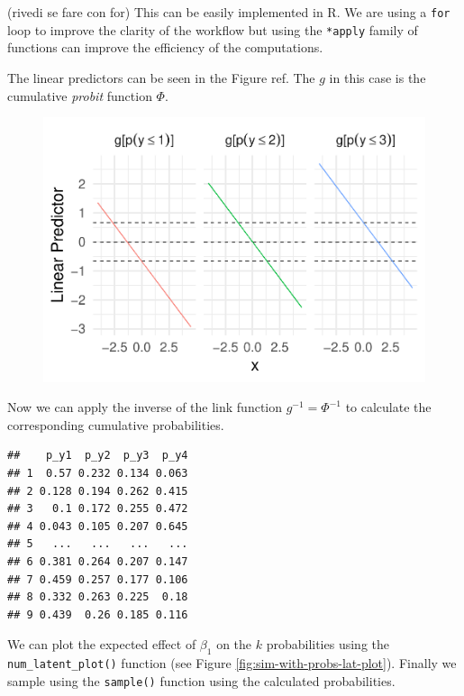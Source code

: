 \documentclass[
  man,floatsintext]{apa6}
\begin{document}
(rivedi se fare con for)
This can be easily implemented in R. We are using a \texttt{for} loop to improve the clarity of the workflow but using the \texttt{*apply} family of functions can improve the efficiency of the computations.

The linear predictors can be seen in the Figure ref. The \(g\) in this case is the cumulative \emph{probit} function \(\Phi\).

\begin{figure}

{\centering \includegraphics{paper-new_files/figure-latex/unnamed-chunk-11-1} 

}

\caption{ }\label{fig:unnamed-chunk-11}
\end{figure}

Now we can apply the inverse of the link function \(g^{-1} = \Phi^{-1}\) to calculate the corresponding cumulative probabilities.

\begin{verbatim}
##    p_y1  p_y2  p_y3  p_y4
## 1  0.57 0.232 0.134 0.063
## 2 0.128 0.194 0.262 0.415
## 3   0.1 0.172 0.255 0.472
## 4 0.043 0.105 0.207 0.645
## 5   ...   ...   ...   ...
## 6 0.381 0.264 0.207 0.147
## 7 0.459 0.257 0.177 0.106
## 8 0.332 0.263 0.225  0.18
## 9 0.439  0.26 0.185 0.116
\end{verbatim}

We can plot the expected effect of \(\beta_1\) on the \(k\) probabilities using the \texttt{num\_latent\_plot()} function (see Figure \ref{fig:sim-with-probs-lat-plot}). Finally we sample using the \texttt{sample()} function using the calculated probabilities.
\end{document}
